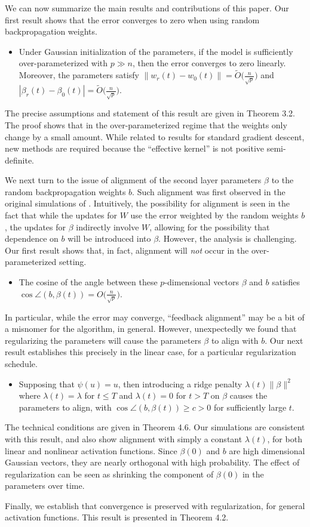 We can now summarize the main results and contributions of this paper. Our first result shows that the error converges to zero when using random backpropagation weights.

\begin{itemize}
  \item Under Gaussian initialization of the parameters, if the model is sufficiently over-parameterized with $p\gg n$, then the error converges to zero linearly. Moreover, the parameters satisfy $\|w_r(t) - w_0(t) \| = \widetilde O\bigl(\frac{n}{\sqrt{p}}\bigr)$
    and $|\beta_r(t) - \beta_0(t) | = \widetilde O\bigl(\frac{n}{\sqrt{p}}\bigr)$.
\end{itemize}
The precise assumptions and statement of this result are given in Theorem 3.2. The proof
shows that in the over-parameterized regime that the weights only change
by a small amount. While related to results for standard gradient descent,
new methods are required because the ``effective kernel'' is not positive semi-definite.

We next turn to the issue of alignment of the second layer parameters $\beta$ to the random backpropagation weights $b$. Such alignment was first observed in the original simulations of \cite{lillicrap2016random}. Intuitively, the possibility for alignment is seen in the fact that while the updates for $W$ use the error weighted by the random weights $b$, the updates for $\beta$ indirectly involve $W$, allowing for the possibility that dependence on $b$ will be introduced into $\beta$. However, the analysis is challenging. Our first result shows that, in fact, alignment will \textit{not} occur in the over-parameterized setting.
\begin{itemize}
\item The cosine of the angle between
these $p$-dimensional vectors $\beta$ and $b$ satisfies $ \cos\angle(b, \beta(t)) = O\big(\frac{n}{\sqrt p}\big)$.
\end{itemize}
In particular, while the error may converge, ``feedback alignment'' may be a bit of a misnomer for the algorithm, in general. However, unexpectedly we found that regularizing the parameters will cause the parameters $\beta$ to align with $b$. Our next result establishes this precisely in the linear case, for a particular regularization schedule.
\begin{itemize}
\item Supposing that $\psi(u)=u$, then introducing a ridge penalty $\lambda(t) \|\beta\|^2$ where $\lambda(t) = \lambda$ for $t\leq T$ and $\lambda(t) = 0$ for $t > T$
on $\beta$  causes the parameters to align, with $\cos\angle(b, \beta(t)) \geq c > 0$ for sufficiently large $t$.
\end{itemize}
The technical conditions are given in Theorem 4.6.
Our simulations are consistent with this result, and also show alignment with simply a constant $\lambda(t)$, for both linear and nonlinear activation functions. Since $\beta(0)$ and $b$ are high dimensional Gaussian vectors, they are nearly orthogonal with high probability. The effect of regularization can be seen as shrinking the component of $\beta(0)$ in the parameters over time.

Finally, we establish that convergence is preserved with regularization, for general activation functions. This result is presented in Theorem 4.2.
